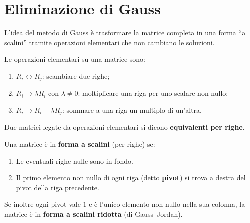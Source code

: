 \section{Eliminazione di Gauss}
\label{sec:gauss}

L'idea del metodo di Gauss è trasformare la matrice completa in una forma ``a scalini'' tramite operazioni elementari che non cambiano le soluzioni.

\begin{definitionbox}
Le operazioni elementari su una matrice sono:
\begin{enumerate}
    \item $R_i \leftrightarrow R_j$: scambiare due righe;
    \item $R_i \to \lambda R_i$ con $\lambda \neq 0$: moltiplicare una riga per uno scalare non nullo;
    \item $R_i \to R_i + \lambda R_j$: sommare a una riga un multiplo di un'altra.
\end{enumerate}
Due matrici legate da operazioni elementari si dicono \textbf{equivalenti per righe}.
\end{definitionbox}

\begin{definitionbox}
Una matrice è in \textbf{forma a scalini} (per righe) se:
\begin{enumerate}
    \item Le eventuali righe nulle sono in fondo.
    \item Il primo elemento non nullo di ogni riga (detto \textbf{pivot}) si trova a destra del pivot della riga precedente.
\end{enumerate}
Se inoltre ogni pivot vale $1$ e è l'unico elemento non nullo nella sua colonna, la matrice è in \textbf{forma a scalini ridotta} (di Gauss--Jordan).
\end{definitionbox}

